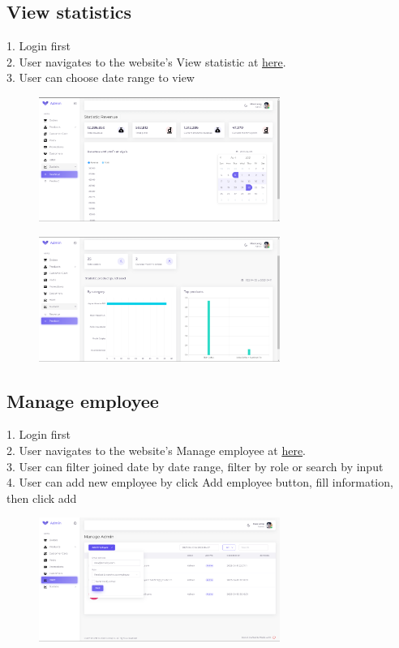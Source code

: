 \subsection{View statistics}
1. Login first \\
2. User navigates to the website's View statistic at \href{https://coffee.skrt.cc/admin/statistic/revenue}{here}. \\
3. User can choose date range to view\\
\begin{figure}[H]
    \centering
    \includegraphics[width=0.7\textwidth]{Demo/Screenshot_4.png}
    \label{fig:supportpage}
\end{figure}
\begin{figure}[H]
    \centering
    \includegraphics[width=0.7\textwidth]{Demo/Screenshot_5.png}
    \label{fig:supportpage}
\end{figure}


\subsection{Manage employee}
1. Login first \\
2. User navigates to the website's Manage employee at \href{https://coffee.skrt.cc/admin/hrm}{here}. \\
3. User can filter joined date by date range, filter by role or search by input\\
4. User can add new employee by click Add employee button, fill information, then click add\\
\begin{figure}[H]
    \centering
    \includegraphics[width=0.7\textwidth]{Demo/Screenshot_7.png}
    \label{fig:supportpage}
\end{figure}

